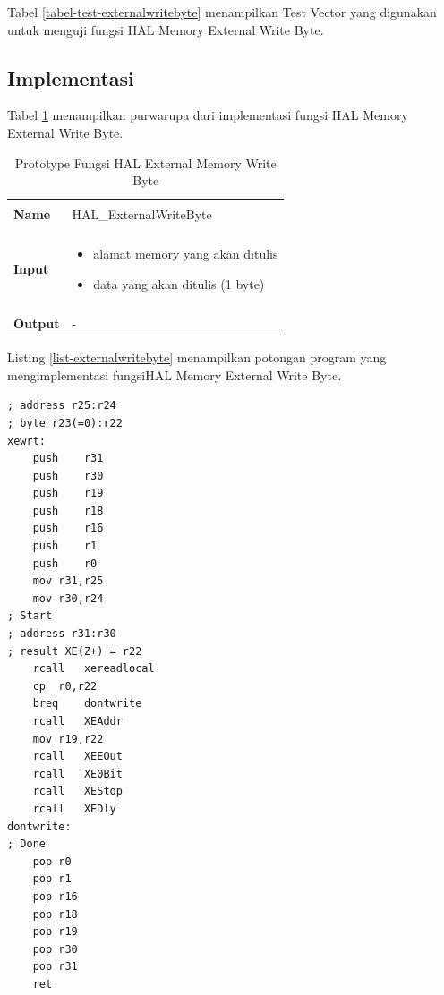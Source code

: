 Tabel \ref{tabel-test-externalwritebyte} menampilkan Test Vector yang digunakan untuk menguji fungsi HAL Memory External Write Byte.

\subsection {Implementasi}

Tabel \ref{tabel-externalwritebyte} menampilkan purwarupa dari implementasi fungsi HAL Memory External Write Byte. 

\begin{table}[!h]
  \centering
  \begin{tabular}{p{2cm} p{8cm}}
    \hline\\
    {\bf Name} & HAL\_ExternalWriteByte\\
    \hline\\
    {\bf Input} & 
    \begin{itemize}[noitemsep,topsep=0pt,parsep=0pt,partopsep=0pt]
    \item alamat memory yang akan ditulis
    \item data yang akan ditulis (1 byte)
    \end{itemize}
    \\
    \hline\\
    {\bf Output} & -
    \\
    \hline
  \end{tabular}
  \caption{Prototype Fungsi HAL External Memory Write Byte}
  \label{tabel-externalwritebyte}
\end{table}

Listing \ref{list-externalwritebyte} menampilkan potongan program yang mengimplementasi fungsiHAL Memory External Write Byte.

\begin{lstlisting}[language={[x86masm]Assembler}, caption={Listing Program Fungsi HAL Memory External Write Byte}, label={list-externalwritebyte}]
; address r25:r24 
; byte r23(=0):r22
xewrt:
	push	r31
	push	r30
	push	r19
	push	r18
	push	r16
	push	r1
	push	r0
	mov	r31,r25
	mov	r30,r24
; Start
; address r31:r30 
; result XE(Z+) = r22
	rcall	xereadlocal
	cp	r0,r22
	breq	dontwrite
	rcall	XEAddr
	mov	r19,r22
	rcall	XEEOut
	rcall	XE0Bit
	rcall	XEStop
	rcall	XEDly
dontwrite: 
; Done
	pop	r0
	pop	r1
	pop	r16
	pop	r18
	pop	r19
	pop	r30
	pop	r31
	ret
\end{lstlisting}
